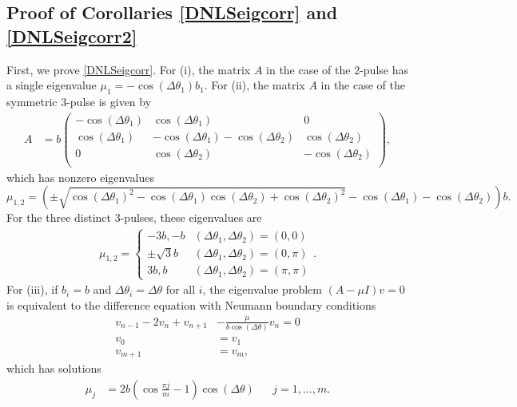 \documentclass[12pt]{elsarticle}
\begin{document}
\subsection{Proof of Corollaries \ref{DNLSeigcorr} and \ref{DNLSeigcorr2}}

First, we prove \cref{DNLSeigcorr}. For (i), the matrix $A$ in the case of the 2-pulse has a single eigenvalue $\mu_1 = -\cos(\Delta\theta_1) b_1$. For (ii), the matrix $A$ in the case of the symmetric 3-pulse is given by
\begin{align*}
A &= b \begin{pmatrix}
-\cos(\Delta\theta_1) & \cos(\Delta\theta_1) & 0  \\
\cos(\Delta\theta_1) & -\cos(\Delta\theta_1) - \cos(\Delta\theta_2) & \cos(\Delta\theta_2) \\ 
0 & \cos(\Delta\theta_2) & -\cos(\Delta\theta_2) \\
\end{pmatrix},
\end{align*}
which has nonzero eigenvalues
\[
\mu_{1, 2} = \left( \pm\sqrt{\cos(\Delta\theta_1)^2 - \cos(\Delta\theta_1) \cos(\Delta\theta_2) + \cos(\Delta\theta_2)^2} - \cos(\Delta\theta_1) - \cos(\Delta\theta_2) \right)b.
\]
For the three distinct 3-pulses, these eigenvalues are
\begin{align*}
\mu_{1, 2} = \begin{cases}
-3b, -b & (\Delta\theta_1, \Delta\theta_2) = (0, 0) \\
\pm \sqrt{3}b & (\Delta\theta_1, \Delta\theta_2) = (0, \pi) \\
3b, b & (\Delta\theta_1, \Delta\theta_2) = (\pi, \pi)
\end{cases}.
\end{align*}
For (iii), if $b_i = b$ and $\Delta\theta_i = \Delta\theta$ for all $i$, the eigenvalue problem $(A - \mu I)v = 0$ is equivalent to the difference equation with Neumann boundary conditions
\begin{equation*}
\begin{aligned}
v_{n-1} - 2 v_n + v_{n+1} &- \frac{\mu}{b \cos(\Delta\theta)} v_n = 0 \\
v_0 &= v_1 \\
v_{m+1} &= v_m,
\end{aligned}
\end{equation*}
which has solutions
\begin{align*}
\mu_j &= 2 b \left( \cos\frac{\pi j}{m} - 1 \right) \cos (\Delta\theta) && j = 1, \dots, m.
\end{align*}
\end{document}
